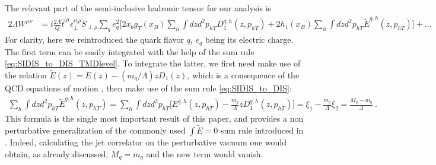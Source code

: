 \documentclass[preprintnumbers,floatfix,nofootinbib]{revtex4}
\newcommand{\mj}{M_q}
\newcommand{\mq}{m_q}
\begin{document}
The relevant part of the semi-inclusive hadronic tensor for our analysis is 
\begin{align}
  \label{eq:Wsidis_ini}
  2 \Lambda  W^{\mu\nu}
    & = i \frac{2\Lambda}{Q} \hat t^{[\mu}_{\phantom \perp} 
    \epsilon_\perp^{\nu]\rho}S_{\perp\rho} 
    \sum_q e_q^2
    \bigg[ 2 x_b g_T(x_B) \sum_h \int dz d^2p_{hT} D_1^{q,h}(z,p_{hT}) 
  + 2 h_1(x_B) \sum_h \int dz d^2p_{hT} \tilde E^{q,h}(z,p_{hT}) \bigg] + \ldots
\end{align}
For clarity, here we reintroduced the quark flavor $q$, $e_q$ being its electric charge.
The first term can be easily integrated with the help of the sum rule
\eqref{eq:SIDIS_to_DIS_TMDlevel}. To integrate the latter, we first need make
use of the relation $\tilde E(z) = E(z) - (\mq/\Lambda) z D_1(z)$, which is a
consequence of the QCD equations of motion \cite{Bacchetta:2006tn}, then
make use of the sum rule \eqref{eq:SIDIS_to_DIS}: 
\begin{align}
  \sum_h \int dz d^2p_{hT} \tilde E^{q,h}(z,p_{hT}) 
    = \sum_h \int dz d^2p_{hT} \Big[ E^{q,h}(z,p_{hT}) - \frac{\mq}{\Lambda} z D_1^{q,h}(z,p_{hT}) \Big]
    = \xi_1 - \frac{\mq}{\Lambda} \xi_2 = \frac{\mj - \mq}{\Lambda} \ .
\end{align}
This formula is the single most important result of this paper, and provides a
non perturbative generalization of the commonly used $\int\tilde E =0$ sum
rule introduced in \cite{Jaffe:1996zw}. Indeed, calculating the jet correlator 
on the perturbative vacuum one would obtain, as already discussed, $\mj=\mq$
and the new term would vanish.
\end{document}
